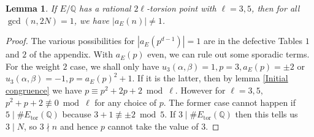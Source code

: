 \documentclass[12pt]{amsart}
\newtheorem{lem}{Lemma}[section]
\newcommand{\Q}{\mathbb{Q}}
\newcommand{\tor}{\mathrm{tor}}
\numberwithin{equation}{section}
\begin{document}
\begin{lem}
If $E/\Q$ has a rational $2\ell$-torsion point with $\ell=3,5$, then for all $\gcd(n,2N)=1$, we have $|a_E(n)|\neq 1$.
\end{lem}
\begin{proof}
The various possibilities for $|a_E(p^{d-1})|=1$ are in the defective Tables $1$ and $2$ of the appendix. With $a_E(p)$ even, we can rule out some sporadic terms. For the weight $2$ case, we shall only have $u_3(\alpha,\beta)=1, p=3, a_E(p)=\pm 2$ or $u_3(\alpha,\beta)=-1, p=a_E(p)^2+1$. If it is the latter, then by lemma \ref{Initial congruence} we have $p\equiv p^2+2p+2\bmod \ell$. However for $\ell=3,5$, $p^2+p+2\not \equiv 0\bmod \ell$ for any choice of $p$. The former case cannot happen if $5\mid \#E_{\tor}(\Q)$ because $3+1\not \equiv \pm 2\bmod 5$. If $3\mid \#E_{\tor}(\Q)$ then this tells us $3\mid N$, so $3\nmid n$ and hence $p$ cannot take the value of $3$.
\end{proof}
\end{document}
